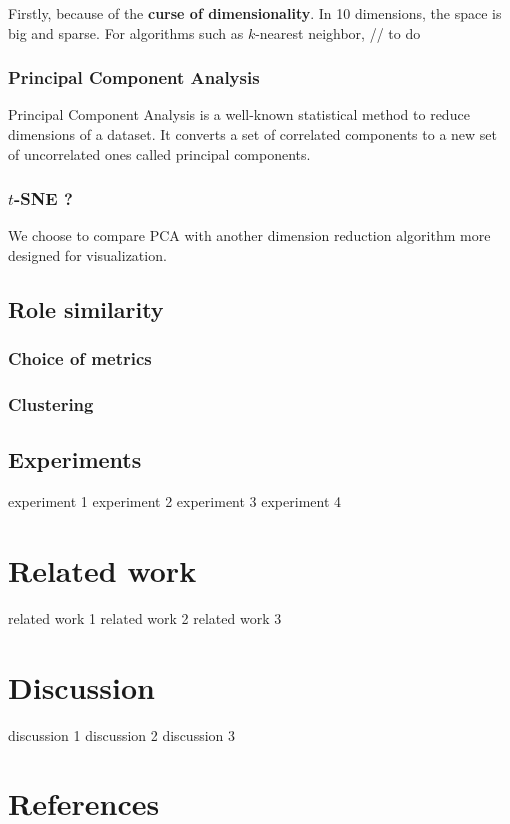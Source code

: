 \documentclass[a4paper,12pt]{report}
\begin{document}
Firstly, because of the \textbf{curse of dimensionality}. In 10 dimensions, the space is big and sparse. For algorithms such as $k$-nearest neighbor, 
// to do

\subsection{Principal Component Analysis}
Principal Component Analysis is a well-known statistical method to reduce dimensions of a dataset. It converts a set of correlated components to a new set of uncorrelated ones called principal components.


\subsection{$t$-SNE ?}
We choose to compare PCA with another dimension reduction algorithm more designed for visualization.

\newpage

\section{Role similarity}
\subsection{Choice of metrics}
\subsection{Clustering}

\newpage

\section{Experiments}
experiment 1 \newpage
experiment 2 \newpage
experiment 3 \newpage
experiment 4 \newpage

\chapter{Related work}
related work 1 \newpage
related work 2 \newpage
related work 3 \newpage

\chapter{Discussion}
discussion 1 \newpage
discussion 2 \newpage
discussion 3 \newpage

\chapter{References}
\end{document}
